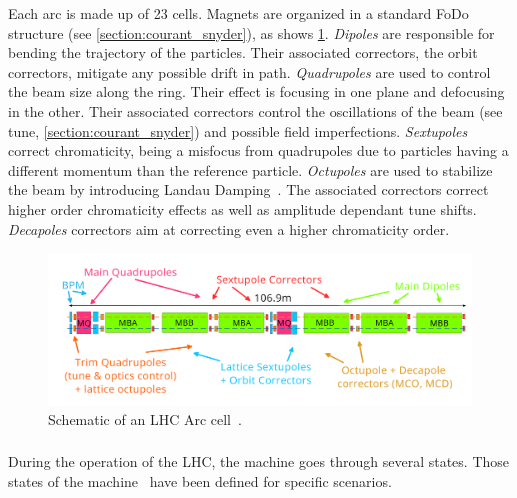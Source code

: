 Each arc is made up of 23 cells. Magnets are organized in a standard FoDo structure
(see \ref{section:courant_snyder}), as shows \cref{fig:introduction:lhc_arc_cell}.
\textit{Dipoles} are responsible for bending the trajectory of the particles. Their associated
correctors, the orbit correctors, mitigate any possible drift in path.
\textit{Quadrupoles} are used to control the beam size along the ring. Their effect is focusing in
one plane and defocusing in the other. Their associated correctors control the oscillations of the
beam (see tune, \ref{section:courant_snyder}) and possible field imperfections.
\textit{Sextupoles} correct chromaticity, being a misfocus from quadrupoles due to particles having
a different momentum than the reference particle.
\textit{Octupoles} are used to stabilize the beam by introducing Landau
Damping~\cite{gareyte_landau_1997}. The associated correctors correct higher order chromaticity
effects as well as amplitude dependant tune shifts.
\textit{Decapoles} correctors aim at correcting even a higher chromaticity order.

\begin{figure}[H]
    \centering
    \includegraphics[width=1\textwidth]{./images/lhc_cell.png}
    \caption{Schematic of an LHC Arc cell~\cite{bruning_lhc_2004}.}
    \label{fig:introduction:lhc_arc_cell}
\end{figure}



\subsubsection{}

During the operation of the LHC, the machine goes through several states. Those states of the
machine~\cite{wenniger_lhc_2019} have been defined for specific scenarios.

